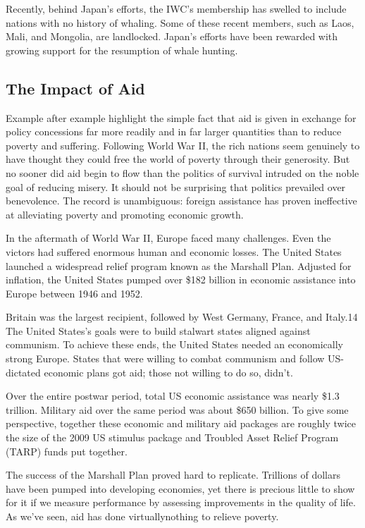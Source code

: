 \documentclass[10pt]{article}
\begin{document}
{\large Recently, behind Japan's efforts, the IWC's membership has swelled to
include nations with no history of whaling. Some of these recent members, such as
Laos, Mali, and Mongolia, are landlocked. Japan's efforts have been rewarded with
growing support for the resumption of whale hunting.}

\subsection{The Impact of Aid}

{\large Example after example highlight the simple fact that aid is given in
exchange for policy concessions far more readily and in far larger quantities
than to reduce poverty and suffering. Following World War II, the rich nations
seem genuinely to have thought they could free the world of poverty through their
generosity. But no sooner did aid begin to flow than the politics of survival
intruded on the noble goal of reducing misery. It should not be surprising that
politics prevailed over benevolence. The record is unambiguous: foreign
assistance has proven ineffective at alleviating poverty and promoting economic
growth.}

{\large In the aftermath of World War II, Europe faced many challenges. Even the
victors had suffered enormous human and economic losses. The United States
launched a widespread relief program known as the Marshall Plan. Adjusted for
inflation, the United States pumped over \$182 billion in economic assistance
into Europe between 1946 and 1952.}

{\large Britain was the largest recipient, followed by West Germany, France, and
Italy.14 The United States's goals were to build stalwart states aligned against
communism. To achieve these ends, the United States needed an economically strong
Europe. States that were willing to combat communism and follow US-dictated
economic plans got aid; those not willing to do so, didn't.}

{\large Over the entire postwar period, total US economic assistance was nearly
\$1.3 trillion. Military aid over the same period was about \$650 billion. To
give some perspective, together these economic and military aid packages are
roughly twice the size of the 2009 US stimulus package and Troubled Asset Relief
Program (TARP) funds put together.}

{\large The success of the Marshall Plan proved hard to replicate. Trillions of
dollars have been pumped into developing economies, yet there is precious little
to show for it if we measure performance by assessing improvements in the quality
of life. As we've seen, aid has done virtuallynothing to relieve poverty.}
\end{document}
